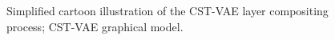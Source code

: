 \label{sec:models}\vspace{-3mm}






\begin{figure}[t]
\begin{center}
\qquad\qquad\qquad
{}\vspace{-3mm}
\end{center}
 \caption{\footnotesize {} Simplified cartoon illustration of the CST-VAE layer compositing process; 
  CST-VAE graphical model.  
 }
\label{fig:stvaemodel}
\end{figure}


